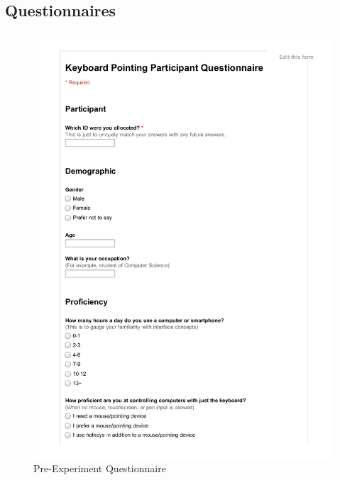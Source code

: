 \documentclass[11pt,openright,a4paper]{report}
\newcommand{\safefigheight}{\dimexpr\textheight-1.1\baselineskip-\abovecaptionskip-\belowcaptionskip\relax}
\begin{document}
\subsection{Questionnaires}
\label{sec:questionnaires}
\begin{figure}[ht]
\caption{Pre-Experiment Questionnaire}
\label{fig:prequestionnaire}
\includegraphics[page=1,width=\textwidth,height=\safefigheight,keepaspectratio]{sheets/PreQuestionnaire.pdf}
\end{figure}
\end{document}
